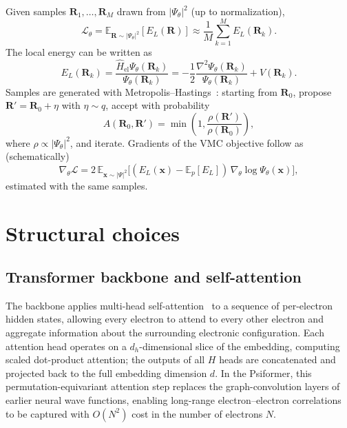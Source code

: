 Given samples $\mathbf{R}_1,\dots,\mathbf{R}_M$ drawn from $|\Psi_\theta|^2$ (up to normalization),
\begin{equation}
	\mathcal{L}_\theta
	=\mathbb{E}_{\mathbf{R}\sim |\Psi_\theta|^2}[E_L(\mathbf{R})]
	\approx \frac{1}{M}\sum_{k=1}^{M} E_L(\mathbf{R}_k).
\end{equation}
The local energy can be written as
\begin{equation}
	E_L(\mathbf{R}_k)
	=\frac{\hat{H}_{\text{el}}\Psi_\theta(\mathbf{R}_k)}{\Psi_\theta(\mathbf{R}_k)}
	=-\frac{1}{2}\frac{\nabla^{2}\Psi_\theta(\mathbf{R}_k)}{\Psi_\theta(\mathbf{R}_k)}+V(\mathbf{R}_k).
\end{equation}
Samples are generated with Metropolis--Hastings~\cite{metropolis}: starting from $\mathbf{R}_0$, propose $\mathbf{R}'=\mathbf{R}_0+\eta$ with $\eta\sim q$, accept with probability
\begin{equation}
	A(\mathbf{R}_0,\mathbf{R}')=\min\left(1,\frac{\rho(\mathbf{R}')}{\rho(\mathbf{R}_0)}\right),
\end{equation}
where $\rho\propto|\Psi_\theta|^2$, and iterate. Gradients of the VMC objective follow as (schematically)
\begin{equation}
	\nabla_{\theta}\mathcal{L}
	=2\,\mathbb{E}_{\mathbf{x}\sim |\Psi|^2}\bigl[(E_L(\mathbf{x})-\mathbb{E}_p[E_L])\,\nabla_\theta\log\Psi_\theta(\mathbf{x})\bigr],
\end{equation}
estimated with the same samples.

\section{Structural choices}

\subsection{Transformer backbone and self-attention}

The backbone applies multi-head self-attention~\cite{attention} to a sequence of per-electron hidden states, allowing every electron to attend to every other electron and aggregate information about the surrounding electronic configuration. Each attention head operates on a $d_h$-dimensional slice of the embedding, computing scaled dot-product attention; the outputs of all $H$ heads are concatenated and projected back to the full embedding dimension $d$. In the Psiformer, this permutation-equivariant attention step replaces the graph-convolution layers of earlier neural wave functions, enabling long-range electron--electron correlations to be captured with $O(N^2)$ cost in the number of electrons $N$.

